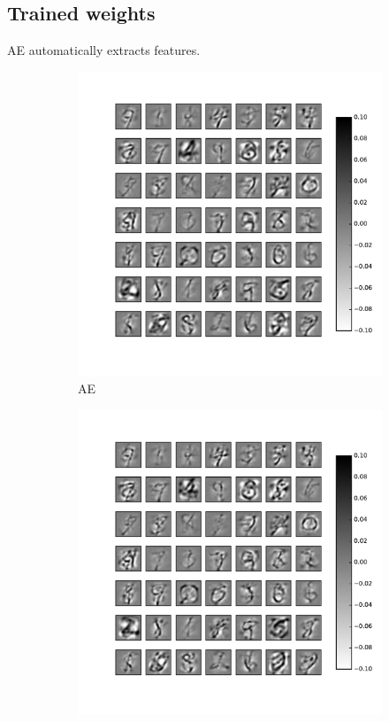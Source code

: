 \subsection{Trained weights}
AE automatically extracts features.

\begin{figure}
	\centering
	\begin{subfigure}[t]{0.4\textwidth}
		\includegraphics[width=\textwidth]{pics_sdlm/22_MNIST_AE/2_60000_0.pdf}
		\caption{AE}
	\end{subfigure}
	\begin{subfigure}[t]{0.4\textwidth}
		\includegraphics[width=\textwidth]{pics_sdlm/23_MNIST_AE_noise/2_60000_0.pdf}

\end{subfigure}
\end{figure}
